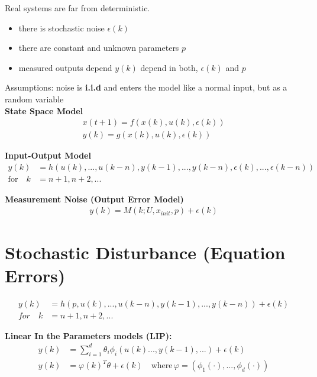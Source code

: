 \begin{tcolorbox}[colback=green!5!white,colframe=green!75!black,title=\textbf{Stochastic Model}]
	Real systems are far from deterministic. 
	\begin{itemize}
		\item there is stochastic noise $\epsilon(k)$ 
		\item there are constant and unknown parameters $p$
		\item measured outputs depend $y(k)$ depend in both, $\epsilon(k)$ and $p$ 
	\end{itemize}
	
	Assumptions:  noise is \textbf{i.i.d} and enters the model like a normal input, but as a random variable\\
	
	\textbf{State Space Model}
	\begin{align*}
	x(t+1) = f(x(k), u(k), \epsilon(k)) \\
	y(k) = g(x(k), u(k), \epsilon(k))
	\end{align*}
	
	\textbf{Input-Output Model}
	\begin{align*}
	y(k) &= h(u(k), ..., u(k-n), y(k-1), ..., y(k-n), \epsilon(k), ..., \epsilon(k-n))\\
	\text{for} \quad k &= n + 1, n + 2, ...
	\end{align*}	
	
	\textbf{Measurement Noise (Output Error Model)}
	\begin{align*}
	y(k) = M(k; U, x_{init}, p) + \epsilon(k)
	\end{align*}
	\tcblower
	\section*{Stochastic Disturbance (Equation Errors)}
	\begin{align*}
	y(k) &= h(p, u(k), ..., u(k-n), y(k-1), ..., y(k-n)) + \epsilon(k)\\
	for \quad k& = n + 1, n + 2, ...
	\end{align*}
	
	\textbf{Linear In the Parameters models (LIP):}
	\begin{align*}
	y(k) &= \sum_{ i = 1}^{d}\theta_i\phi_i(u(k)...,y(k-1),...)+\epsilon(k)\\
	y(k) &= \varphi(k)^T\theta + \epsilon(k) \quad \text{where} \, \varphi = (\phi_1(\cdot),... ,\phi_d(\cdot)) 
	\end{align*}


\end{tcolorbox}
